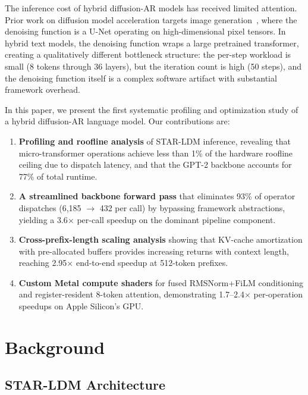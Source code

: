 \documentclass[sigconf,authordraft]{acmart}
\begin{document}
The inference cost of hybrid diffusion-AR models has received limited attention. Prior work on diffusion model acceleration targets image generation~\cite{song2023consistency,salimans2022progressive,dao2022flashattention}, where the denoising function is a U-Net operating on high-dimensional pixel tensors. In hybrid text models, the denoising function wraps a large pretrained transformer, creating a qualitatively different bottleneck structure: the per-step workload is small (8 tokens through 36 layers), but the iteration count is high (50 steps), and the denoising function itself is a complex software artifact with substantial framework overhead.

In this paper, we present the first systematic profiling and optimization study of a hybrid diffusion-AR language model. Our contributions are:

\begin{enumerate}
    \item \textbf{Profiling and roofline analysis} of STAR-LDM inference, revealing that micro-transformer operations achieve less than 1\% of the hardware roofline ceiling due to dispatch latency, and that the GPT-2 backbone accounts for 77\% of total runtime.

    \item \textbf{A streamlined backbone forward pass} that eliminates 93\% of operator dispatches (6{,}185 $\to$ 432 per call) by bypassing framework abstractions, yielding a 3.6$\times$ per-call speedup on the dominant pipeline component.

    \item \textbf{Cross-prefix-length scaling analysis} showing that KV-cache amortization with pre-allocated buffers provides increasing returns with context length, reaching 2.95$\times$ end-to-end speedup at 512-token prefixes.

    \item \textbf{Custom Metal compute shaders} for fused RMSNorm+FiLM conditioning and register-resident 8-token attention, demonstrating 1.7--2.4$\times$ per-operation speedups on Apple Silicon's GPU.
\end{enumerate}

\section{Background}

\subsection{STAR-LDM Architecture}
\end{document}
